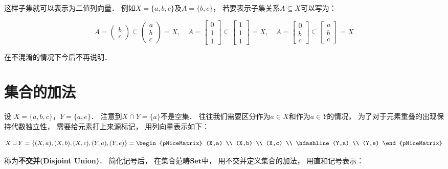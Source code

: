 \documentclass[10pt, openany]{book}
\begin{document}
这样子集就可以表示为二值列向量．
例如$X=\{a,b,c\}$及$A=\{b,c\}$，
若要表示子集关系$A \subseteq X$可以写为：

$$
A = \begin{pmatrix}
b \\ c
\end{pmatrix}
\subseteq
\begin{pmatrix}
a \\ b \\ c
\end{pmatrix}
= X, \quad
A = \begin{bmatrix}
0 \\ 1 \\ 1
\end{bmatrix}
\subseteq
\begin{bmatrix}
1 \\ 1 \\ 1
\end{bmatrix}
= X, \quad
A = \begin{bmatrix}
0 \\ b \\ c
\end{bmatrix}
\subseteq
\begin{bmatrix}
a \\ b \\ c
\end{bmatrix}
= X
$$

在不混淆的情况下今后不再说明．

\section{集合的加法}

设 $X = \{a, b, c\}$，$Y = \{a,e\}$．
注意到$X \cap Y = \{a\}$不是空集．
往往我们需要区分作为$a\in X$和作为$a\in Y$的情况，
为了对于元素重叠的出现保持代数独立性，
需要给元素打上来源标记，
用列向量表示如下：

\begin{equation}
X \sqcup Y 
= \{ (X,a), (X,b), (X,c), (Y,a), (Y,e) \}
= \begin{pNiceMatrix}
    (X,a) \\ (X,b) \\ (X,c) \\ \hdashline
    (Y,a) \\ (Y,e) 
\end{pNiceMatrix}
\end{equation}

称为\textbf{不交并(Disjoint Union)}．
简化记号后，
在集合范畴$\mathbf{Set}$中，
用不交并定义集合的加法，
用直和记号表示：
\end{document}

